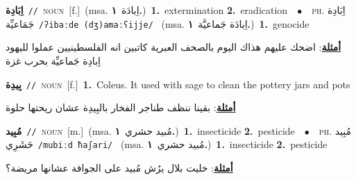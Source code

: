 \documentclass[10pt,a4paper,twoside]{article} %
\begin{document}
\begin{multicols}{2}
{\setlength\topsep{0pt}\textbf{\foreignlanguage{arabic}{اِبَادِة}}\ {\color{gray}\texttt{//}\color{black}}\ \textsc{noun}\ [f.]\ \color{gray}(msa. \foreignlanguage{arabic}{اِبادَة}~\foreignlanguage{arabic}{\textbf{١.}})\color{black}\ \textbf{1.}~extermination  \textbf{2.}~eradication\ \ $\bullet$\ \ \textsc{ph.} \color{gray} \foreignlanguage{arabic}{اِبَادِة جَمَاعيِّة}\color{black}\ {\color{gray}\texttt{/{\sffamily ʔibaːde (dʒ)amaːʕijje}/}\color{black}}\ \color{gray} (msa. \foreignlanguage{arabic}{اِبادَة جَماعيَّة}~\foreignlanguage{arabic}{\textbf{١.}})\color{black}\ \textbf{1.}~genocide\  \begin{flushright}\color{gray}\foreignlanguage{arabic}{\textbf{\underline{\foreignlanguage{arabic}{أمثلة}}}: اضحك عليهم هذاك اليوم بالصحف العبرية كاتبين انه الفلسطينيين عملوا لليهود اِبادِة جَماعيِّة بحرب غزة}\end{flushright}\color{black}} \vspace{2mm}

{\setlength\topsep{0pt}\textbf{\foreignlanguage{arabic}{بِيدِة}}\ {\color{gray}\texttt{//}\color{black}}\ \textsc{noun}\ [f.]\ \textbf{1.}~Coleus. It used with sage to clean the pottery jars and pots\  \begin{flushright}\color{gray}\foreignlanguage{arabic}{\textbf{\underline{\foreignlanguage{arabic}{أمثلة}}}: بقينا ننظف طناجر الفخار بالبِيدِة عشان ريحتها حلوة}\end{flushright}\color{black}} \vspace{2mm}

{\setlength\topsep{0pt}\textbf{\foreignlanguage{arabic}{مُبِيد}}\ {\color{gray}\texttt{//}\color{black}}\ \textsc{noun}\ [m.]\ \color{gray}(msa. \foreignlanguage{arabic}{مُبيد حشري}~\foreignlanguage{arabic}{\textbf{١.}})\color{black}\ \textbf{1.}~insecticide  \textbf{2.}~pesticide\ \ $\bullet$\ \ \textsc{ph.} \color{gray} \foreignlanguage{arabic}{مُبِيد حَشَرِي}\color{black}\ {\color{gray}\texttt{/{\sffamily mubiːd ħaʃari}/}\color{black}}\ \color{gray} (msa. \foreignlanguage{arabic}{مُبيد حشري}~\foreignlanguage{arabic}{\textbf{١.}})\color{black}\ \textbf{1.}~insecticide  \textbf{2.}~pesticide\  \begin{flushright}\color{gray}\foreignlanguage{arabic}{\textbf{\underline{\foreignlanguage{arabic}{أمثلة}}}: خليت بلال يرُش مُبيد على الجوافة عشانها مريضة؟}\end{flushright}\color{black}} \vspace{2mm}


\end{multicols}
\end{document}
